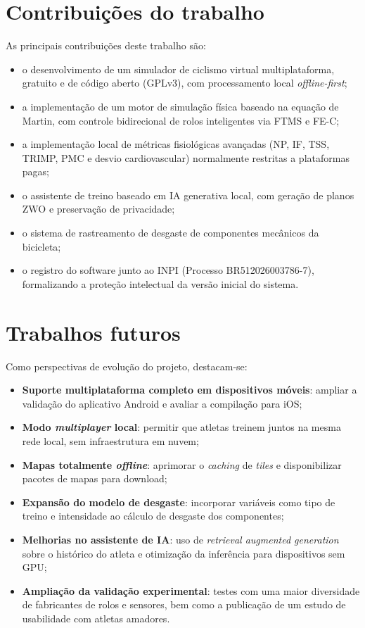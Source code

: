 \section{Contribuições do trabalho}
\label{sec:contribuicoes}

As principais contribuições deste trabalho são:

\begin{itemize}
    \item o desenvolvimento de um simulador de ciclismo virtual multiplataforma,
        gratuito e de código aberto (GPLv3), com processamento local
        \textit{offline-first};
    \item a implementação de um motor de simulação física baseado na equação de
        Martin, com controle bidirecional de rolos inteligentes via FTMS e FE-C;
    \item a implementação local de métricas fisiológicas avançadas (NP, IF,
        TSS, TRIMP, PMC e desvio cardiovascular) normalmente restritas a
        plataformas pagas;
    \item o assistente de treino baseado em IA generativa local, com geração de
        planos ZWO e preservação de privacidade;
    \item o sistema de rastreamento de desgaste de componentes mecânicos da
        bicicleta;
    \item o registro do software junto ao INPI (Processo BR512026003786-7),
        formalizando a proteção intelectual da versão inicial do sistema.
\end{itemize}

\section{Trabalhos futuros}
\label{sec:trabalhos-futuros}

Como perspectivas de evolução do projeto, destacam-se:

\begin{itemize}
    \item \textbf{Suporte multiplataforma completo em dispositivos móveis}:
        ampliar a validação do aplicativo Android e avaliar a compilação para
        iOS;
    \item \textbf{Modo \textit{multiplayer} local}: permitir que atletas
        treinem juntos na mesma rede local, sem infraestrutura em nuvem;
    \item \textbf{Mapas totalmente \textit{offline}}: aprimorar o
        \textit{caching} de \textit{tiles} e disponibilizar pacotes de mapas
        para download;
    \item \textbf{Expansão do modelo de desgaste}: incorporar variáveis como
        tipo de treino e intensidade ao cálculo de desgaste dos componentes;
    \item \textbf{Melhorias no assistente de IA}: uso de \textit{retrieval
        augmented generation} sobre o histórico do atleta e otimização da
        inferência para dispositivos sem GPU;
    \item \textbf{Ampliação da validação experimental}: testes com uma maior
        diversidade de fabricantes de rolos e sensores, bem como a publicação
        de um estudo de usabilidade com atletas amadores.
\end{itemize}
